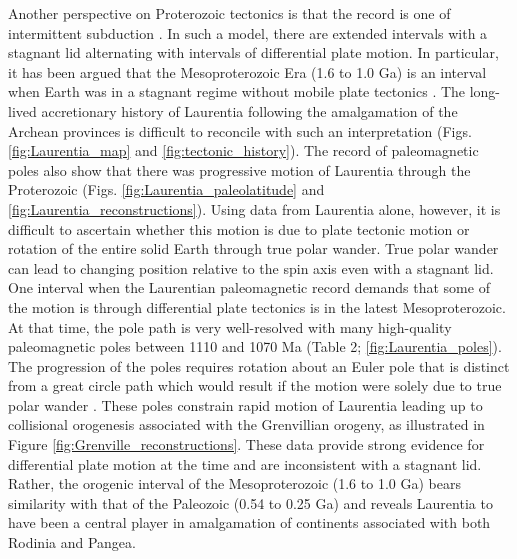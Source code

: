 \documentclass[twocolumn, switch]{article} %
\begin{document}
Another perspective on Proterozoic tectonics is that the record is one of intermittent subduction \citep{Silver2008a, ONeill2013a}. In such a model, there are extended intervals with a stagnant lid alternating with intervals of differential plate motion. In particular, it has been argued that the Mesoproterozoic Era (1.6 to 1.0 Ga) is an interval when Earth was in a stagnant regime without mobile plate tectonics \citep{Silver2008a, ONeill2013a}. The long-lived accretionary history of Laurentia following the amalgamation of the Archean provinces is difficult to reconcile with such an interpretation (Figs. \ref{fig:Laurentia_map} and \ref{fig:tectonic_history}). The record of paleomagnetic poles also show that there was progressive motion of Laurentia through the Proterozoic (Figs. \ref{fig:Laurentia_paleolatitude} and \ref{fig:Laurentia_reconstructions}). Using data from Laurentia alone, however, it is difficult to ascertain whether this motion is due to plate tectonic motion or rotation of the entire solid Earth through true polar wander. True polar wander can lead to changing position relative to the spin axis even with a stagnant lid. One interval when the Laurentian paleomagnetic record demands that some of the motion is through differential plate tectonics is in the latest Mesoproterozoic. At that time, the pole path is very well-resolved with many high-quality paleomagnetic poles between 1110 and 1070 Ma (Table 2; \ref{fig:Laurentia_poles}). The progression of the poles requires rotation about an Euler pole that is distinct from a great circle path which would result if the motion were solely due to true polar wander \citep{Swanson-Hysell2019a}. These poles constrain rapid motion of Laurentia leading up to collisional orogenesis associated with the Grenvillian orogeny, as illustrated in Figure \ref{fig:Grenville_reconstructions}. These data provide strong evidence for differential plate motion at the time and are inconsistent with a stagnant lid. Rather, the orogenic interval of the Mesoproterozoic (1.6 to 1.0 Ga) bears similarity with that of the Paleozoic (0.54 to 0.25 Ga) and reveals Laurentia to have been a central player in amalgamation of continents associated with both Rodinia and Pangea.
\end{document}
